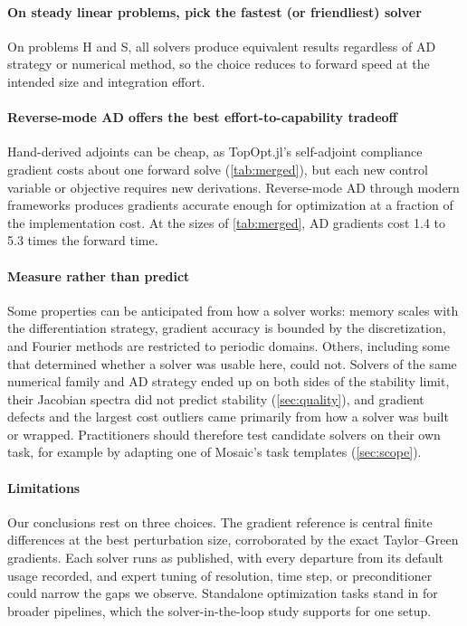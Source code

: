\paragraph{On steady linear problems, pick the fastest (or friendliest) solver}
On problems H and S, all solvers produce equivalent
results regardless of AD strategy or numerical method, so the choice
reduces to forward speed at the intended size and integration effort.

\paragraph{Reverse-mode AD offers the best effort-to-capability tradeoff}
Hand-derived adjoints can be cheap, as TopOpt.jl's self-adjoint compliance
gradient costs about one forward solve (\cref{tab:merged}), but each new
control variable or objective requires new derivations. Reverse-mode AD
through modern frameworks produces gradients accurate enough for
optimization at a fraction of the implementation cost. At the sizes of
\cref{tab:merged}, AD gradients cost 1.4 to 5.3 times the forward time.

\paragraph{Measure rather than predict}
Some properties can be anticipated from how a solver works: memory scales with the differentiation strategy, gradient
accuracy is bounded by the discretization, and Fourier methods are
restricted to periodic domains. Others, including some that determined whether a solver was usable here, could not.
Solvers of the same numerical family and AD strategy ended up on both sides of the stability limit, their Jacobian
spectra did not predict stability (\cref{sec:quality}), and gradient defects
and the largest cost outliers came primarily from how a solver was built or wrapped.
Practitioners should therefore test candidate solvers on their own task, for
example by adapting one of Mosaic's task templates (\cref{sec:scope}).

\paragraph{Limitations}
Our conclusions rest on three choices. The gradient reference is central
finite differences at the best perturbation size, corroborated by the exact
Taylor--Green gradients. Each solver runs as published, with every
departure from its default usage recorded, and expert tuning of
resolution, time step, or preconditioner could narrow the gaps we observe.
Standalone optimization tasks stand in for broader pipelines, which the
solver-in-the-loop study supports for one setup.

